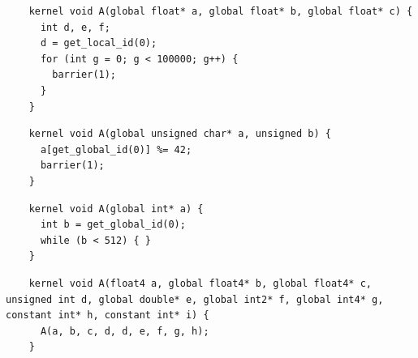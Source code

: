 
\newsavebox{\NvidiaOptLoopHang}
\begin{lrbox}{\NvidiaOptLoopHang}
  \hspace{1.5em}
  \begin{lstlisting}
    kernel void A(global float* a, global float* b, global float* c) {
      int d, e, f;
      d = get_local_id(0);
      for (int g = 0; g < 100000; g++) {
        barrier(1);
      }
    }
  \end{lstlisting}
\end{lrbox}

\newsavebox{\XeonPhiSpin}
\begin{lrbox}{\XeonPhiSpin}
  \hspace{1.5em}
  \begin{lstlisting}
    kernel void A(global unsigned char* a, unsigned b) {
      a[get_global_id(0)] %= 42;
      barrier(1);
    }
  \end{lstlisting}
\end{lrbox}

\newsavebox{\IntelOptLoopHang}
\begin{lrbox}{\IntelOptLoopHang}
  \hspace{1.5em}
  \begin{lstlisting}
    kernel void A(global int* a) {
      int b = get_global_id(0);
      while (b < 512) { }
    }
  \end{lstlisting}
\end{lrbox}


\newsavebox{\NvidiaRecursionSegfault}
\begin{lrbox}{\NvidiaRecursionSegfault}
  \hspace{1.5em}
  \begin{lstlisting}
    kernel void A(float4 a, global float4* b, global float4* c, unsigned int d, global double* e, global int2* f, global int4* g, constant int* h, constant int* i) {
      A(a, b, c, d, d, e, f, g, h);
    }
  \end{lstlisting}
\end{lrbox}
%

